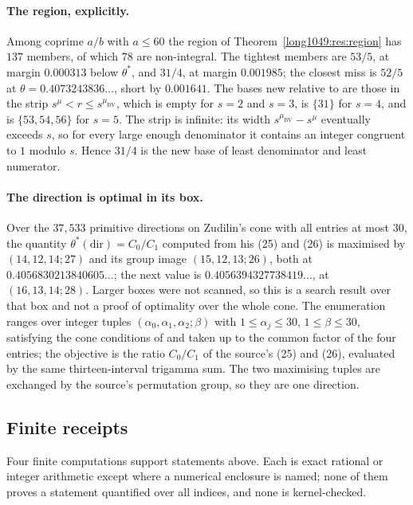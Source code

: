 \paragraph{The region, explicitly.}
Among coprime $a/b$ with $a\le60$ the region of Theorem~\ref{long1049:res:region} has
$137$ members, of which $78$ are non-integral.  The tightest members are $53/5$,
at margin $0.000313$ below $\theta^{*}$, and $31/4$, at margin $0.001985$; the
closest miss is $52/5$ at $\theta=0.4073243836\ldots$, short by $0.001641$.  The
bases new relative to \cite{bv1994} are those in the strip
$s^{\mu}<r\le s^{\mu_{\mathrm{BV}}}$, which is empty for $s=2$ and $s=3$, is
$\{31\}$ for $s=4$, and is $\{53,54,56\}$ for $s=5$.  The strip is infinite:
its width $s^{\mu_{\mathrm{BV}}}-s^{\mu}$ eventually exceeds $s$, so for every
large enough denominator it contains an integer congruent to $1$ modulo $s$.
Hence $31/4$ is the new base of least denominator and least numerator.

\paragraph{The direction is optimal in its box.}
Over the $37{,}533$ primitive directions on Zudilin's cone with all entries at
most $30$, the quantity $\theta^{*}(\mathrm{dir})=C_0/C_1$ computed from his
(25) and (26) is maximised by $(14,12,14;27)$ and its group image
$(15,12,13;26)$, both at $0.4056830213840605\ldots$; the next value is
$0.4056394327738419\ldots$, at $(16,13,14;28)$.  Larger boxes were not scanned,
so this is a search result over that box and not a proof of optimality over the
whole cone.  The enumeration ranges over integer tuples
$(\alpha_0,\alpha_1,\alpha_2;\beta)$ with $1\le\alpha_j\le30$,
$1\le\beta\le30$, satisfying the cone conditions of \cite[Sec.~5]{zudilin2004}
and taken up to the common factor of the four entries; the objective is the
ratio $C_0/C_1$ of the source's (25) and (26), evaluated by the same
thirteen-interval trigamma sum.  The two maximising tuples are exchanged by the
source's permutation group, so they are one direction.

\subsection{Finite receipts}\label{long1049:sec:receipts}

Four finite computations support statements above.  Each is exact rational or
integer arithmetic except where a numerical enclosure is named; none of them
proves a statement quantified over all indices, and none is kernel-checked.

